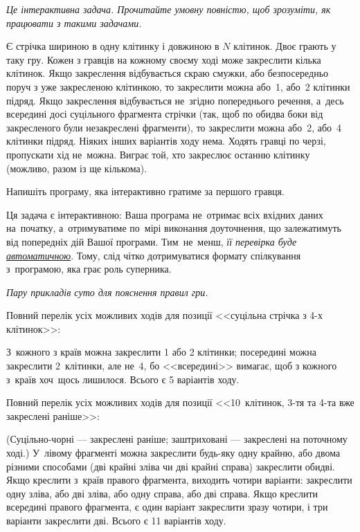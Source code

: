 {\it Це інтерактивна задача. Прочитайте умовну повністю, щоб зрозуміти, як працювати з такими задачами.}

Є стрічка шириною в одну клітинку і довжиною в $N$ клітинок.
Двоє грають у таку гру.
Кожен з гравців на кожному своєму ході може закреслити кілька клітинок. 
Якщо закреслення відбувається скраю смужки, або безпосередньо поруч з уже закресленою клітинкою,
то закреслити можна або~1, або~2 клітинки підряд.
Якщо закреслення відбувається не~згідно попереднього речення, а~десь всер{\it е}дині досі суцільного фрагмента стрічки (так, щоб по обидва боки від закресленого були незакреслені фрагменти), то закреслити можна або~2, або~4 клітинки підряд.
Ніяких інших варіантів ходу нема. 
Ходять гравці по черзі, пропускати хід не~можна.
Виграє той, хто закреслює останню клітинку (можливо, разом із ще кількома).

Напишіть програму, яка інтерактивно гратиме за першого гравця. 

Ця задача є інтерактивною: 
Ваша програма не~отримає всіх вхідних даних на~початку,
а~отримуватиме по~мірі виконання доуточнення, 
що залежатимуть від попередніх дій Вашої програми. 
Тим~не~менш, {\it її перевірка буде
\underline{автоматичною}}. 
Тому, слід чітко дотримуватися формату спілкування з~програмою, яка грає роль суперника.


{\it Пару прикладів суто для пояснення правил гри.}

Повний перелік усіх можливих ходів для позиції <<суцільна стрічка з 4-х клітинок>>:


З~кожного з країв можна закреслити 1 або 2 клітинки; 
посередині можна закреслити 2~клітинки, 
але не~4, бо <<всер{\it е}дині>> вимагає, щоб з кожного з~країв хоч~щось лишилося.
Всього є 5 варіантів ходу.


Повний перелік усіх можливих ходів для позиції <<10~клітинок, 3-тя та 4-та вже закреслені раніше>>:


(Суцільно-чорні --- закреслені раніше; заштриховані --- закреслені на поточному ході.)
У~лівому фрагменті можна закреслити будь-яку одну крайню, або двома різними способами (дві крайні зліва чи дві крайні справа) закреслити обидві.
Якщо креслити з~країв правого фрагмента, виходить чотири варіанти: закреслити 
одну зліва, або
дві зліва, або
одну справа, або
дві справа.
Якщо креслити всер{\it е}дині правого фрагмента, є один варіант закреслити зразу чотири,
і три варіанти закреслити дві.
Всього є 11 варіантів ходу.


